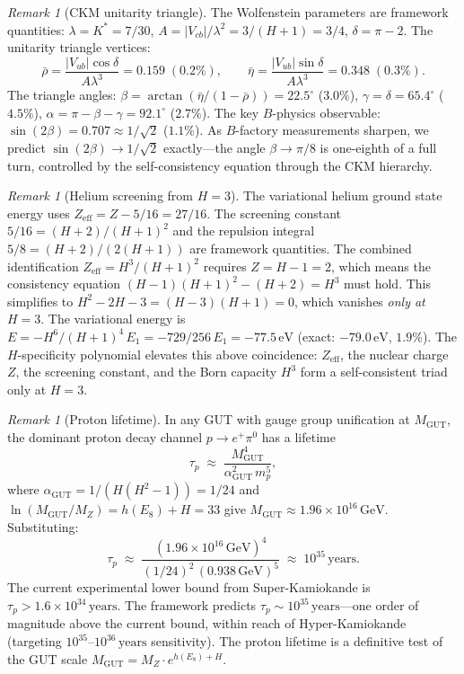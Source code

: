 \documentclass[11pt,a4paper]{article}
\theoremstyle{definition}
\theoremstyle{remark}
\newtheorem{remark}[theorem]{Remark}
\begin{document}
\begin{remark}[CKM unitarity triangle]\label{rem:ckm_triangle}
The Wolfenstein parameters are framework quantities: $\lambda=K^*=7/30$, $A=|V_{cb}|/\lambda^2=3/(H+1)=3/4$, $\delta=\pi-2$. The unitarity triangle vertices:
\[
\bar\rho = \frac{|V_{ub}|\cos\delta}{A\lambda^3} = 0.159 \;(0.2\%),\qquad
\bar\eta = \frac{|V_{ub}|\sin\delta}{A\lambda^3} = 0.348 \;(0.3\%).
\]
The triangle angles: $\beta=\arctan(\bar\eta/(1-\bar\rho))=22.5^\circ$ ($3.0\%$), $\gamma=\delta=65.4^\circ$ ($4.5\%$), $\alpha=\pi-\beta-\gamma=92.1^\circ$ ($2.7\%$). The key $B$-physics observable: $\sin(2\beta)=0.707\approx 1/\sqrt{2}$ ($1.1\%$). As $B$-factory measurements sharpen, we predict $\sin(2\beta)\to 1/\sqrt{2}$ exactly---the angle $\beta\to\pi/8$ is one-eighth of a full turn, controlled by the self-consistency equation through the CKM hierarchy.
\end{remark}

\begin{remark}[Helium screening from $H=3$]\label{rem:helium}
The variational helium ground state energy uses $Z_\mathrm{eff}=Z-5/16=27/16$. The screening constant $5/16=(H+2)/(H+1)^2$ and the repulsion integral $5/8=(H+2)/(2(H+1))$ are framework quantities. The combined identification $Z_\mathrm{eff}=H^3/(H+1)^2$ requires $Z=H-1=2$, which means the consistency equation $(H-1)(H+1)^2-(H+2)=H^3$ must hold. This simplifies to $H^2-2H-3=(H-3)(H+1)=0$, which vanishes \emph{only at $H=3$}. The variational energy is $E=-H^6/(H+1)^4\,E_1=-729/256\,E_1=-77.5\,\mathrm{eV}$ (exact: $-79.0\,\mathrm{eV}$, $1.9\%$). The $H$-specificity polynomial elevates this above coincidence: $Z_\mathrm{eff}$, the nuclear charge $Z$, the screening constant, and the Born capacity $H^3$ form a self-consistent triad only at $H=3$.
\end{remark}

\begin{remark}[Proton lifetime]\label{rem:proton_lifetime}
In any GUT with gauge group unification at $M_\mathrm{GUT}$, the dominant proton decay channel $p\to e^+\pi^0$ has a lifetime
\begin{equation}\label{eq:proton_lifetime}
\tau_p \;\approx\; \frac{M_\mathrm{GUT}^4}{\alpha_\mathrm{GUT}^2\,m_p^5},
\end{equation}
where $\alpha_\mathrm{GUT}=1/(H(H^2-1))=1/24$ and $\ln(M_\mathrm{GUT}/M_Z)=h(E_8)+H=33$ give $M_\mathrm{GUT}\approx 1.96\times 10^{16}\,\mathrm{GeV}$. Substituting:
\[
\tau_p \;\approx\; \frac{(1.96\times 10^{16}\,\mathrm{GeV})^4}{(1/24)^2\,(0.938\,\mathrm{GeV})^5} \;\approx\; 10^{35}\,\mathrm{years}.
\]
The current experimental lower bound from Super-Kamiokande is $\tau_p>1.6\times 10^{34}\,\mathrm{years}$. The framework predicts $\tau_p\sim 10^{35}\,\mathrm{years}$---one order of magnitude above the current bound, within reach of Hyper-Kamiokande (targeting $10^{35}$--$10^{36}\,\mathrm{years}$ sensitivity). The proton lifetime is a definitive test of the GUT scale $M_\mathrm{GUT}=M_Z\cdot e^{h(E_8)+H}$.
\end{remark}
\end{document}
